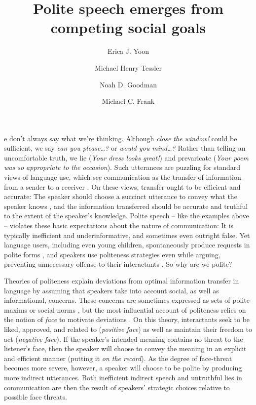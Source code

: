 \documentclass[9pt,twocolumn,twoside,lineno]{main_class_file}
\title{Polite speech emerges from competing social goals}
\author[a,1,2]{Erica J. Yoon}
\author[a,1]{ Michael Henry Tessler}
\author[a]{Noah D. Goodman}
\author[a]{Michael C. Frank}
\affil[a]{Department of Psychology, Stanford University}
\begin{document}
\maketitle
\thispagestyle{firststyle}


e don't always say what we're thinking. Although \emph{close the
window!} could be sufficient, we say \emph{can you please\ldots{}?}
or \emph{would you mind\ldots{}?} Rather than telling an
uncomfortable truth, we lie (\emph{Your dress looks great!}) and
prevaricate (\emph{Your poem was so appropriate to the occasion}).
Such utterances are puzzling for standard views of language use, which
see communication as the transfer of information from a sender to a
receiver \cite{buhler1934, frank2012, jakobson1960, shannon1948}. On these views, transfer ought to be efficient and accurate: The
speaker should choose a succinct utterance to convey what the speaker
knows \cite{grice1975, searle1975}, and the information transferred
should be accurate and truthful to the extent of the speaker's
knowledge. Polite speech -- like the examples above -- violates these
basic expectations about the nature of communication: It is typically
inefficient and underinformative, and sometimes even outright false. Yet
language users, including even young children, spontaneously produce
requests in polite forms \cite{axia1985, clark1980}, and speakers use politeness strategies even while arguing,
preventing unnecessary offense to their interactants \cite{holtgraves1997}.
So why are we polite?


Theories of politeness explain deviations from optimal information
transfer in language by assuming that speakers take into account social,
as well as informational, concerns. These concerns are sometimes
expressed as sets of polite maxims \cite{leech1983} or social norms \cite{ide1989}, 
but the most influential account of politeness relies on the
notion of \emph{face} to motivate deviations \cite{brown1987, goffman1967}. 
On this theory, interactants seek to be liked,
approved, and related to (\emph{positive face}) as well as maintain
their freedom to act (\emph{negative face}). If the speaker's
intended meaning contains no threat to the listener's face, then the
speaker will choose to convey the meaning in an explicit and efficient
manner (putting it \emph{on the record}). As the degree of
face-threat becomes more severe, however, a speaker will choose to be
polite by producing more indirect utterances. Both inefficient indirect
speech and untruthful lies in communication are then the result of
speakers' strategic choices relative to possible face threats.
\end{document}
